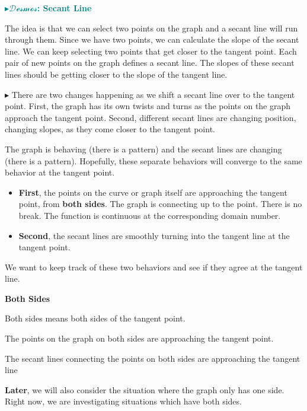 \documentclass{ximera}
\begin{document}
\begin{onlineOnly}
\textbf{\textcolor{teal}{$\blacktriangleright \mathcal{Desmos}$: Secant Line}} 
\begin{center}
\end{center}
\end{onlineOnly}


The idea is that we can select two points on the graph and a secant line will run through them. Since we have two points, we can calculate the slope of the secant line. We can keep selecting two points that get closer to the tangent point. Each pair of new points on the graph defines a secant line. The slopes of these secant lines should be getting closer to the slope of the tangent line. 




\textbf{\textcolor{red!70!darkgray}{$\blacktriangleright$}} There are two changes happening as we shift a secant line over to the tangent point. First, the graph has its own twists and turns as the points on the graph approach the tangent point. Second, different secant lines are changing position, changing slopes, as they come closer to the tangent point. 



The graph is behaving (there is a pattern) and the secant lines are changing (there is a pattern). Hopefully, these separate behaviors will converge to the same behavior at the tangent point.



\begin{itemize}
\item \textbf{First}, the points on the curve or graph itself are approaching the tangent point, from \textbf{both sides}. The graph is connecting up to the point. There is no break. The function is continuous at the corresponding domain number.
\item \textbf{Second}, the secant lines are smoothly turning into the tangent line at the tangent point. 
\end{itemize}



We want to keep track of these two behaviors and see if they agree at the tangent line. 


\begin{warning} \textbf{\textcolor{red!70!black}{Both Sides}}

Both sides means both sides of the tangent point. 

The points on the graph on both sides are approaching the tangent point. 

The secant lines connecting the points on both sides are approaching the tangent line




\end{warning}
\textbf{Later}, we will also consider the situation where the graph only has one side. Right now, we are investigating situations which have both sides.
\end{document}
